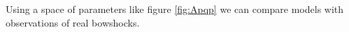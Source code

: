 Using a space of parameters like figure \ref{fig:Apqp} we can compare models with observations of real bowshocks.


 


